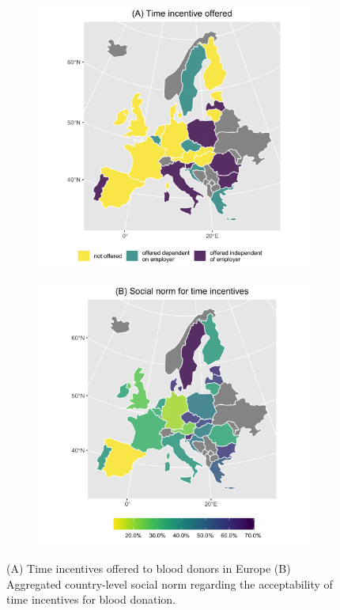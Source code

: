\documentclass[AER]{AEA}
\begin{document}
\begin{figure}[hbt!]
\begin{subfigure}{.48\textwidth}
  \centering
  \includegraphics[width=\linewidth]{images/incentive_time_NA_removed.png}  
\end{subfigure}
\begin{subfigure}{.48\textwidth}
  \centering
  \includegraphics[width=\linewidth]{images/soc_time.png}  
\end{subfigure}
\caption{ (A) Time incentives offered to blood donors in Europe (B) Aggregated country-level social norm regarding the acceptability of time incentives for blood donation.}
\label{fig:time_maps}
\end{figure}
\end{document}
